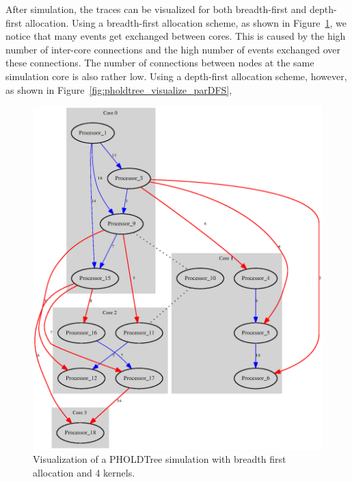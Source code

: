 After simulation, the traces can be visualized for both breadth-first and depth-first allocation.
Using a breadth-first allocation scheme, as shown in Figure~\ref{fig:pholdtree_visualize_parBFS}, we notice that many events get exchanged between cores.
This is caused by the high number of inter-core connections and the high number of events exchanged over these connections.
The number of connections between nodes at the same simulation core is also rather low.
Using a depth-first allocation scheme, however, as shown in Figure~\ref{fig:pholdtree_visualize_parDFS},

\begin{figure}
    \center
    \includegraphics[width=\columnwidth]{fig/pholdtreed1n3t5000c4BFS.eps}
    \caption{Visualization of a PHOLDTree simulation with breadth first allocation and 4 kernels.}
    \label{fig:pholdtree_visualize_parBFS}
\end{figure}
